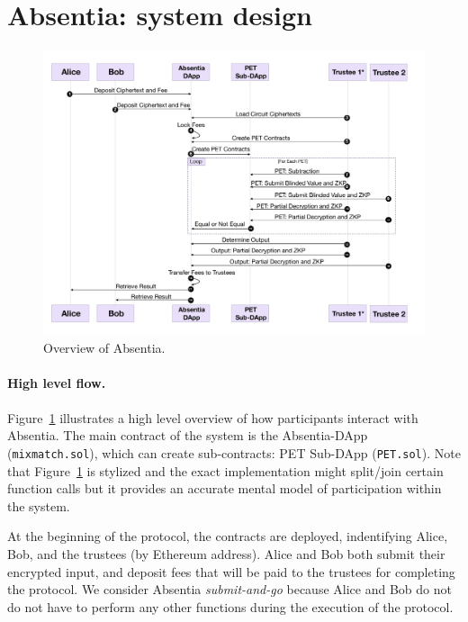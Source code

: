 
\section{Absentia: system design}
\label{sec:system}

\begin{figure}[t]
	\includegraphics[width=1\textwidth]{figures/absentia.pdf}
	\caption{Overview of Absentia.}
	\centering
	\label{fig:system}
\end{figure}


\paragraph{High level flow.} 
Figure~\ref{fig:system} illustrates a high level overview of how participants interact with Absentia. The main contract of the system is the Absentia-DApp (\texttt{mixmatch.sol}), which can create sub-contracts: PET Sub-DApp (\texttt{PET.sol}). Note that Figure~\ref{fig:system} is stylized and the exact implementation might split/join certain function calls but it provides an accurate mental model of participation within the system.

At the beginning of the protocol, the contracts are deployed, indentifying Alice, Bob, and the trustees (by Ethereum address). Alice and Bob both submit their encrypted input, and deposit fees that will be paid to the trustees for completing the protocol. We consider Absentia \emph{submit-and-go} because Alice and Bob do not do not have to perform any other functions during the execution of the protocol. 
 
